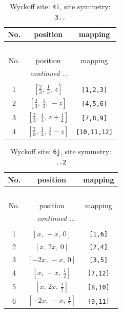 \documentclass[fleqn,8pt]{jsarticle}
\begin{document}
\renewcommand{\arraystretch}{1.2}
\begin{longtable}{ccc}
\caption{Wyckoff site: {\tt 4i}, site symmetry: {\tt 3..}}
 \\
 \hline \hline
No. & position & mapping \\ \hline \endfirsthead

\multicolumn{2}{l}{\tablename\ \thetable{}} \\
 \hline \hline
No. & position & mapping \\ \hline \endhead

 \hline \hline
\multicolumn{2}{r}{\footnotesize\it continued ...} \\ \endfoot

 \hline \hline
\multicolumn{2}{r}{} \\ \endlastfoot

1 & $\left[ \frac{2}{3},\, \frac{1}{3},\, z \right]$ & {\tt [1,2,3]} \\ \hline
2 & $\left[ \frac{2}{3},\, \frac{1}{3},\, - z \right]$ & {\tt [4,5,6]} \\ \hline
3 & $\left[ \frac{2}{3},\, \frac{1}{3},\, z + \frac{1}{2} \right]$ & {\tt [7,8,9]} \\ \hline
4 & $\left[ \frac{2}{3},\, \frac{1}{3},\, \frac{1}{2} - z \right]$ & {\tt [10,11,12]} \\
\end{longtable}
\renewcommand{\arraystretch}{1.2}
\begin{longtable}{ccc}
\caption{Wyckoff site: {\tt 6j}, site symmetry: {\tt ..2}}
 \\
 \hline \hline
No. & position & mapping \\ \hline \endfirsthead

\multicolumn{2}{l}{\tablename\ \thetable{}} \\
 \hline \hline
No. & position & mapping \\ \hline \endhead

 \hline \hline
\multicolumn{2}{r}{\footnotesize\it continued ...} \\ \endfoot

 \hline \hline
\multicolumn{2}{r}{} \\ \endlastfoot

1 & $\left[ x,\, - x,\, 0 \right]$ & {\tt [1,6]} \\ \hline
2 & $\left[ x,\, 2 x,\, 0 \right]$ & {\tt [2,4]} \\ \hline
3 & $\left[ - 2 x,\, - x,\, 0 \right]$ & {\tt [3,5]} \\ \hline
4 & $\left[ x,\, - x,\, \frac{1}{2} \right]$ & {\tt [7,12]} \\ \hline
5 & $\left[ x,\, 2 x,\, \frac{1}{2} \right]$ & {\tt [8,10]} \\ \hline
6 & $\left[ - 2 x,\, - x,\, \frac{1}{2} \right]$ & {\tt [9,11]} \\
\end{longtable}
\end{document}
